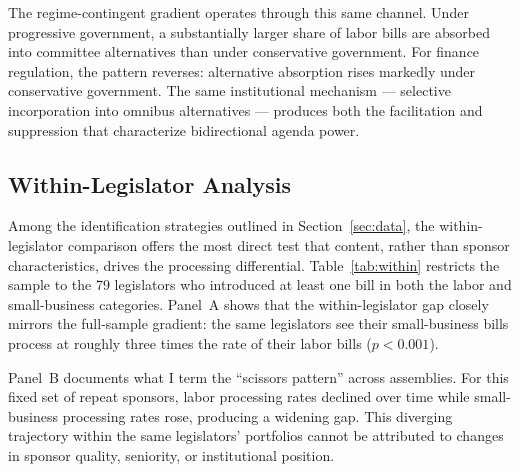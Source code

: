 \documentclass[11pt]{article}
\begin{document}
The regime-contingent gradient operates through this same channel. Under progressive government, a substantially larger share of labor bills are absorbed into committee alternatives than under conservative government. For finance regulation, the pattern reverses: alternative absorption rises markedly under conservative government. The same institutional mechanism --- selective incorporation into omnibus alternatives --- produces both the facilitation and suppression that characterize bidirectional agenda power.

\subsection{Within-Legislator Analysis}

Among the identification strategies outlined in Section~\ref{sec:data}, the within-legislator comparison offers the most direct test that content, rather than sponsor characteristics, drives the processing differential. Table~\ref{tab:within} restricts the sample to the 79 legislators who introduced at least one bill in both the labor and small-business categories. Panel~A shows that the within-legislator gap closely mirrors the full-sample gradient: the same legislators see their small-business bills process at roughly three times the rate of their labor bills ($p < 0.001$).

Panel~B documents what I term the ``scissors pattern'' across assemblies. For this fixed set of repeat sponsors, labor processing rates declined over time while small-business processing rates rose, producing a widening gap. This diverging trajectory within the same legislators' portfolios cannot be attributed to changes in sponsor quality, seniority, or institutional position.
\end{document}
